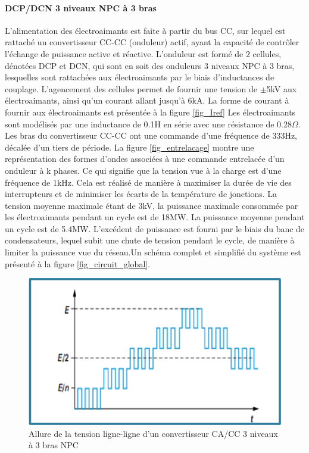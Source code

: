 \paragraph{DCP/DCN 3 niveaux NPC à 3 bras}L'alimentation des électroaimants est faite à partir du bus CC, sur lequel est rattaché un convertisseur CC-CC (onduleur) actif, ayant la capacité de contrôler l'échange de puissance active et réactive. L'onduleur est formé de 2 cellules, dénotées DCP et DCN, qui sont en soit des onduleurs 3 niveaux NPC à 3 bras, lesquelles sont rattachées aux électroaimants par le biais d'inductances de couplage. L'agencement des cellules permet de fournir une tension de $\pm$5kV aux électroaimants, ainsi qu'un courant allant jusqu'à 6kA. La forme de courant à fournir aux électroaimants est présentée à la figure \ref{fig_Iref} Les électroaimants sont modélisés par une inductance de 0.1H en série avec une résistance de 0.28$\Omega$. Les bras du convertisseur CC-CC ont une commande d'une fréquence de 333Hz, décalée d'un tiers de période. La figure \ref{fig_entrelacage} montre une représentation des formes d'ondes associées à une commande entrelacée d'un onduleur à k phases. Ce qui signifie que la tension vue à la charge est d'une fréquence de 1kHz. Cela est réalisé de manière à maximiser la durée de vie des interrupteurs et de minimiser les écarts de la température de jonctions. La tension moyenne maximale étant de 3kV, la puissance maximale consommée par les électroaimants pendant un cycle est de 18MW. La puissance moyenne pendant un cycle est de 5.4MW. L'excédent de puissance est fourni par le biais du banc de condensateurs, lequel subit une chute de tension pendant le cycle, de manière à limiter la puissance vue du réseau.Un schéma complet et simplifié du système est présenté à la figure \ref{fig_circuit_global}.

\begin{figure}[htb]
\centering
\includegraphics[scale=0.5]{fig/3L_Line_Voltage.png}
\caption{Allure de la tension ligne-ligne d'un convertisseur CA/CC 3 niveaux à 3 bras NPC}
\label{fig_3L_Line_Voltage}
\end{figure}

